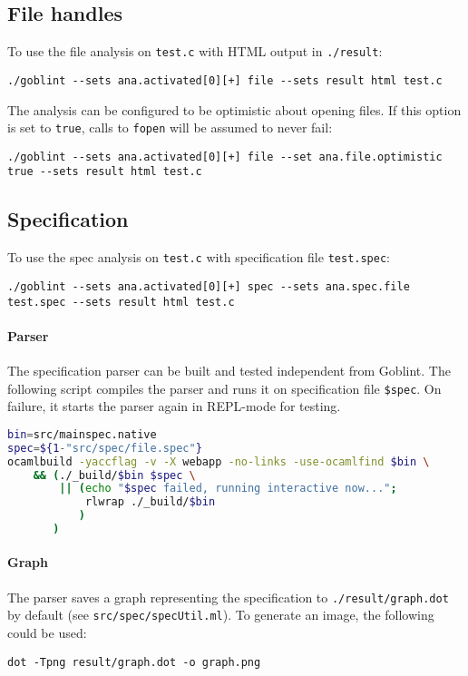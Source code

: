 \subsection{File handles}
To use the file analysis on \verb|test.c| with HTML output in \verb|./result|:
\begin{lstlisting}
./goblint --sets ana.activated[0][+] file --sets result html test.c
\end{lstlisting}
The analysis can be configured to be optimistic about opening files. If this option is set to \verb|true|, calls to \verb|fopen| will be assumed to never fail:
\begin{lstlisting}
./goblint --sets ana.activated[0][+] file --set ana.file.optimistic true --sets result html test.c
\end{lstlisting}

\subsection{Specification}
To use the spec analysis on \verb|test.c| with specification file \verb|test.spec|:
\begin{lstlisting}
./goblint --sets ana.activated[0][+] spec --sets ana.spec.file test.spec --sets result html test.c
\end{lstlisting}
\paragraph*{Parser}
The specification parser can be built and tested independent from Goblint. The following script compiles the parser and runs it on specification file \verb|$spec|. On failure, it starts the parser again in REPL-mode for testing.
\begin{lstlisting}[language=bash]
bin=src/mainspec.native
spec=${1-"src/spec/file.spec"}
ocamlbuild -yaccflag -v -X webapp -no-links -use-ocamlfind $bin \
    && (./_build/$bin $spec \
        || (echo "$spec failed, running interactive now...";
            rlwrap ./_build/$bin
           )
       )
\end{lstlisting}
\paragraph*{Graph}
The parser saves a graph representing the specification to \verb|./result/graph.dot| by default (see \verb|src/spec/specUtil.ml|).
To generate an image, the following could be used:
\begin{lstlisting}
dot -Tpng result/graph.dot -o graph.png 
\end{lstlisting}
